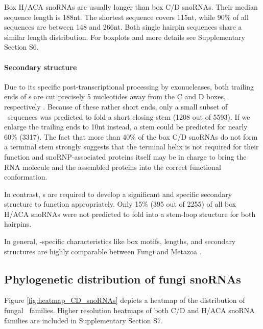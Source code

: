 Box H/ACA snoRNAs are usually longer than box C/D snoRNAs. Their
median sequence length is 188nt. The shortest sequence covers
115nt, while 90\% of all sequences are between 148 and 266nt.  Both
single hairpin sequences share a similar length distribution. For
boxplots and more details see Supplementary Section S6.

\paragraph{\textbf{Secondary structure}} Due to its specific
post-transcriptional processing by exonucleases, both trailing ends of
\cd s are cut precisely 5 nucleotides away from the C and D
boxes, respectively \citep{Kishore:2013}. Because of these rather
short ends, only a small subset of \sno\ sequences was predicted to
fold a short closing stem (1208 out of 5593).  If we enlarge the
trailing ends to 10nt instead, a stem could be predicted for nearly
60\% (3317). The fact that more than 40\% of the box C/D snoRNAs do
not form a terminal stem
strongly suggests that the terminal helix is not required for their
function and snoRNP-associated proteins itself may be in charge to bring
the RNA molecule and the assembled proteins into the correct
functional conformation.

In contrast, \haca s are required to develop a significant and
specific secondary structure to function appropriately. Only 15\% (395
out of 2255) of all box H/ACA snoRNAs were not predicted to fold into
a stem-loop structure for both hairpins.


In general, \sno -specific characteristics like box motifs, lengths,
and secondary structures are highly comparable between Fungi and
Metazoa \cite{Kehr:2014}.

\subsection{Phylogenetic distribution of fungi snoRNAs}

Figure \ref{fig:heatmap_CD_snoRNAs} depicts a heatmap of the
distribution of fungal \cd\ families.  Higher resolution heatmaps of
both C/D and H/ACA snoRNA families are included in Supplementary Section
S7.

